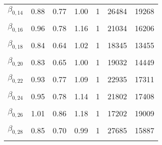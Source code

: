 \begin{table}
\begin{tabular}[t]{lrrrrrr}
$\beta_{0, 14}$ & 0.88 & 0.77 & 1.00 & 1 & 26484 & 19268\\
\cellcolor{gray!6}{$\beta_{0, 15}$} & \cellcolor{gray!6}{0.88} & \cellcolor{gray!6}{0.73} & \cellcolor{gray!6}{1.04} & \cellcolor{gray!6}{1} & \cellcolor{gray!6}{24110} & \cellcolor{gray!6}{15964}\\
$\beta_{0, 16}$ & 0.96 & 0.78 & 1.16 & 1 & 21034 & 16206\\
\cellcolor{gray!6}{$\beta_{0, 17}$} & \cellcolor{gray!6}{0.89} & \cellcolor{gray!6}{0.73} & \cellcolor{gray!6}{1.06} & \cellcolor{gray!6}{1} & \cellcolor{gray!6}{22181} & \cellcolor{gray!6}{15773}\\
$\beta_{0, 18}$ & 0.84 & 0.64 & 1.02 & 1 & 18345 & 13455\\
\cellcolor{gray!6}{$\beta_{0, 19}$} & \cellcolor{gray!6}{0.88} & \cellcolor{gray!6}{0.74} & \cellcolor{gray!6}{1.02} & \cellcolor{gray!6}{1} & \cellcolor{gray!6}{21452} & \cellcolor{gray!6}{17338}\\
$\beta_{0, 20}$ & 0.83 & 0.65 & 1.00 & 1 & 19032 & 14449\\
\cellcolor{gray!6}{$\beta_{0, 21}$} & \cellcolor{gray!6}{0.91} & \cellcolor{gray!6}{0.76} & \cellcolor{gray!6}{1.07} & \cellcolor{gray!6}{1} & \cellcolor{gray!6}{22343} & \cellcolor{gray!6}{16544}\\
$\beta_{0, 22}$ & 0.93 & 0.77 & 1.09 & 1 & 22935 & 17311\\
\cellcolor{gray!6}{$\beta_{0, 23}$} & \cellcolor{gray!6}{0.85} & \cellcolor{gray!6}{0.69} & \cellcolor{gray!6}{1.01} & \cellcolor{gray!6}{1} & \cellcolor{gray!6}{23467} & \cellcolor{gray!6}{15972}\\
$\beta_{0, 24}$ & 0.95 & 0.78 & 1.14 & 1 & 21802 & 17408\\
\cellcolor{gray!6}{$\beta_{0, 25}$} & \cellcolor{gray!6}{0.81} & \cellcolor{gray!6}{0.68} & \cellcolor{gray!6}{0.93} & \cellcolor{gray!6}{1} & \cellcolor{gray!6}{20839} & \cellcolor{gray!6}{16243}\\
$\beta_{0, 26}$ & 1.01 & 0.86 & 1.18 & 1 & 17202 & 19009\\
\cellcolor{gray!6}{$\beta_{0, 27}$} & \cellcolor{gray!6}{0.93} & \cellcolor{gray!6}{0.80} & \cellcolor{gray!6}{1.07} & \cellcolor{gray!6}{1} & \cellcolor{gray!6}{22145} & \cellcolor{gray!6}{17652}\\
$\beta_{0, 28}$ & 0.85 & 0.70 & 0.99 & 1 & 27685 & 15887\\
\cellcolor{gray!6}{$\beta_{0, 29}$} & \cellcolor{gray!6}{0.85} & \cellcolor{gray!6}{0.70} & \cellcolor{gray!6}{0.99} & \cellcolor{gray!6}{1} & \cellcolor{gray!6}{21302} & \cellcolor{gray!6}{15385}\\

\end{tabular}
\end{table}
